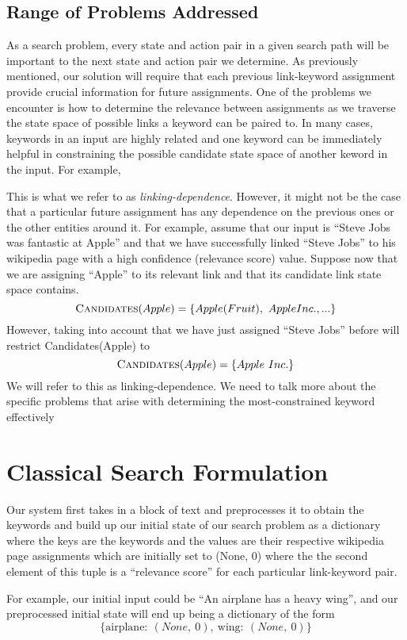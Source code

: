 \documentclass[twoside,11pt]{article}
\begin{document}
\subsection{Range of Problems Addressed}

As a search problem, every state and action pair in a given search path will be important to the next state and action pair we determine. As previously mentioned, our solution will require that each previous link-keyword assignment provide crucial information for future assignments. One of the problems we encounter is how to determine the relevance between assignments as we traverse the state space of possible links a keyword can be paired to. In many cases, keywords in an input are highly related and one keyword can be immediately helpful in constraining the possible candidate state space of another keword in the input. For example,

This is what we refer to as \textit{linking-dependence}. However, it might not be the case that a particular future assignment has any dependence on the previous ones or the other entities around it. For example, assume that our input is ``Steve Jobs was fantastic at Apple'' and that we have successfully linked ``Steve Jobs'' to his wikipedia page with a high confidence (relevance score) value. Suppose now that we are assigning ``Apple'' to its relevant link and that its candidate link state space contains.
$$\mbox{{\sc Candidates}}(Apple) = \{Apple (Fruit), \ Apple Inc., ...\}$$
However, taking into account that we have just assigned ``Steve Jobs'' before will restrict {\sc Candidates}(Apple) to
$$\mbox{{\sc Candidates}}(Apple) = \{Apple \ Inc.\}$$
We will refer to this as linking-dependence. We need to talk more about the specific problems that arise with determining the most-constrained keyword effectively

\section{Classical Search Formulation}
Our system first takes in a block of text and preprocesses it to obtain the keywords and build up our initial state of our search problem as a dictionary where the keys are the keywords and the values are their respective wikipedia page assignments which are initially set to (None, 0) where the the second element of this tuple is a ``relevance score'' for each particular link-keyword pair.

For example, our initial input could be ``An airplane has a heavy wing'', and our preprocessed initial state will end up being a dictionary of the form $$\{\mbox{airplane}: \ (None, \ 0), \  \mbox{wing}: \ (None, \ 0)\}$$
\end{document}
